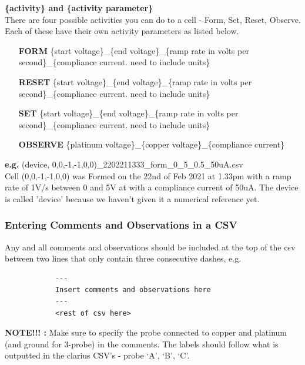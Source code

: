\documentclass{article}
\begin{document}
          \textbf{\{activity\} and \{activity parameter\}} \\
          There are four possible activities you can do to a cell - Form, Set, Reset, Observe. Each of these have their
          own activity parameters as listed below.

          \begin{itemize}
            \item [\textbf{FORM}] \{start voltage\}\_\{end voltage\}\_\{ramp rate in volts per second\}\_\{compliance
              current. need to include units\}
            \item [\textbf{RESET}] \{start voltage\}\_\{end voltage\}\_\{ramp rate in volts per second\}\_\{compliance
              current. need to include units\}
            \item [\textbf{SET}] \{start voltage\}\_\{end voltage\}\_\{ramp rate in volts per second\}\_\{compliance
              current. need to include units\}
            \item [\textbf{OBSERVE}] \{platinum voltage\}\_\{copper voltage\}\_\{compliance current\}
          \end{itemize}

          \textbf{e.g.} (device, 0,0,-1,-1,0,0)\_2202211333\_form\_0\_5\_0.5\_50uA.csv \\ Cell (0,0,-1,-1,0,0) was
          Formed on the 22nd of Feb 2021 at 1.33pm with a ramp rate of 1V/s between 0 and 5V at with a compliance
          current of 50uA. The device is called 'device' because we haven't given it a numerical reference yet.

        \subsubsection{Entering Comments and Observations in a CSV} \label{comments}

          Any and all comments and observations should be included at the top of the csv between two lines that only
          contain three consecutive dashes, e.g. 
          \begin{verbatim} 
            ---
            Insert comments and observations here 
            --- 
            <rest of csv here>
          \end{verbatim}

          \textbf{NOTE!!! :} Make sure to specify the probe connected to copper and platinum (and ground for 3-probe) in
          the comments. The labels should follow what is outputted in the clarius CSV's - probe `A', `B', `C'.
\end{document}
